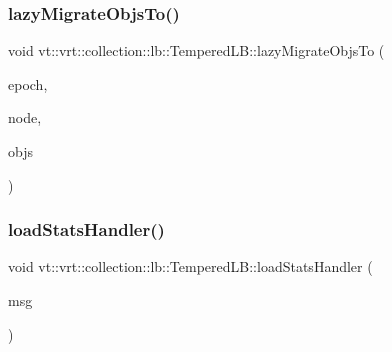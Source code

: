 \mbox{\label{structvt_1_1vrt_1_1collection_1_1lb_1_1_tempered_l_b_a00af3637cea1d345fea518d2608d5596}} 
\subsubsection{\texorpdfstring{lazy\+Migrate\+Objs\+To()}{lazyMigrateObjsTo()}}
{\footnotesize\ttfamily void vt\+::vrt\+::collection\+::lb\+::\+Tempered\+L\+B\+::lazy\+Migrate\+Objs\+To (\begin{DoxyParamCaption}\item[{\hyperlink{namespacevt_a81d11b28122d43bf9834577e4a06440f}{Epoch\+Type}}]{epoch,  }\item[{\hyperlink{namespacevt_a866da9d0efc19c0a1ce79e9e492f47e2}{Node\+Type}}]{node,  }\item[{\hyperlink{structvt_1_1vrt_1_1collection_1_1lb_1_1_tempered_l_b_ad54faf59319f1b33dec689ee853d688e}{Objs\+Type} const \&}]{objs }\end{DoxyParamCaption})\hspace{0.3cm}{\ttfamily [protected]}}

\mbox{\label{structvt_1_1vrt_1_1collection_1_1lb_1_1_tempered_l_b_a732661a8f887c88514c7435ea628230c}} 
\subsubsection{\texorpdfstring{load\+Stats\+Handler()}{loadStatsHandler()}}
{\footnotesize\ttfamily void vt\+::vrt\+::collection\+::lb\+::\+Tempered\+L\+B\+::load\+Stats\+Handler (\begin{DoxyParamCaption}\item[{\hyperlink{structvt_1_1vrt_1_1collection_1_1lb_1_1_tempered_l_b_a59e5358a716ab79ac33c552cba9033f9}{Stats\+Msg\+Type} $\ast$}]{msg }\end{DoxyParamCaption})\hspace{0.3cm}{\ttfamily [protected]}}

